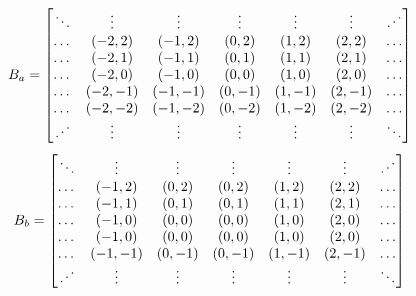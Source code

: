 \[
B_{a} = 
\begin{bmatrix}
    \ddots                & \vdots & \vdots & \vdots & \vdots & \vdots & \reflectbox{$\ddots$} \\
    \dots                 &(-2, 2) &(-1, 2) &(0, 2)  &(1, 2)  &(2, 2)  & \dots                 \\
    \dots                 &(-2, 1) &(-1, 1) &(0, 1)  &(1, 1)  &(2, 1)  & \dots                 \\
    \dots                 &(-2, 0) &(-1, 0) &(0, 0)  &(1, 0)  &(2, 0)  & \dots                 \\
    \dots                 &(-2, -1)&(-1, -1)&(0, -1) &(1, -1) &(2, -1) & \dots                 \\
    \dots                 &(-2, -2)&(-1, -2)&(0, -2) &(1, -2) &(2, -2) & \dots                 \\
    \reflectbox{$\ddots$} & \vdots & \vdots & \vdots & \vdots & \vdots & \ddots                \\
    
\end{bmatrix}
\]
\[
B_{b} = 
\begin{bmatrix}
    \ddots                & \vdots & \vdots & \vdots & \vdots & \vdots & \reflectbox{$\ddots$} \\
    \dots                 &(-1, 2) &(0, 2)  &(0, 2)  &(1, 2)  &(2, 2)  & \dots                 \\
    \dots                 &(-1, 1) &(0, 1)  &(0, 1)  &(1, 1)  &(2, 1)  & \dots                 \\
    \dots                 &(-1, 0) &(0, 0)  &(0, 0)  &(1, 0)  &(2, 0)  & \dots                 \\
    \dots                 &(-1, 0) &(0, 0)  &(0, 0)  &(1, 0)  &(2, 0) & \dots                 \\
    \dots                 &(-1, -1)&(0, -1) &(0, -1) &(1, -1) &(2, -1) & \dots                 \\
    \reflectbox{$\ddots$} & \vdots & \vdots & \vdots & \vdots & \vdots & \ddots                \\
    
\end{bmatrix}
\]

